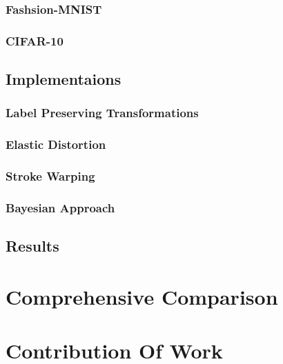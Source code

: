 \subsection{Fashsion-MNIST}
\subsection{CIFAR-10}


\section{Implementaions}

\subsection{Label Preserving Transformations}
\subsection{Elastic Distortion}
\subsection{Stroke Warping}
\subsection{Bayesian Approach}

\section{Results}



\chapter{Comprehensive Comparison}

\chapter{Contribution Of Work}